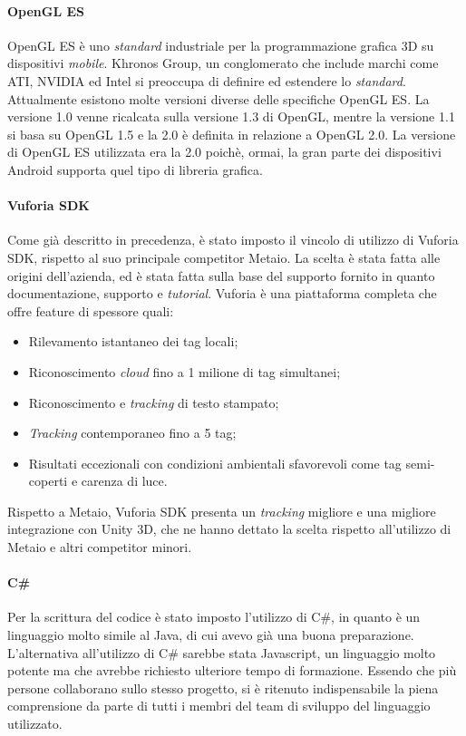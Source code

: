 \paragraph{OpenGL ES}
OpenGL ES è uno \textit{standard} industriale per la programmazione grafica 3D su dispositivi \textit{mobile}. Khronos Group, un conglomerato che include marchi come ATI, NVIDIA ed Intel si preoccupa di definire ed estendere lo \textit{standard}.
Attualmente esistono molte versioni diverse delle specifiche OpenGL ES. La versione 1.0 venne ricalcata sulla versione 1.3 di OpenGL, mentre la versione 1.1 si basa su OpenGL 1.5 e la 2.0 è definita in relazione a OpenGL 2.0. La versione di OpenGL ES utilizzata era la 2.0 poich\`e, ormai, la gran parte dei dispositivi Android supporta quel tipo di libreria grafica.

\paragraph{Vuforia SDK}
Come gi\`a descritto in precedenza, \`e stato imposto il vincolo di utilizzo di Vuforia SDK, rispetto al suo principale competitor Metaio. La scelta \`e stata fatta alle origini dell'azienda, ed \`e stata fatta sulla base del supporto fornito in quanto documentazione, supporto e \textit{tutorial}. Vuforia \`e una piattaforma completa che offre feature di spessore quali:

\begin{itemize}
	\item Rilevamento istantaneo dei tag locali;
	\item Riconoscimento \textit{cloud} fino a 1 milione di tag simultanei;
	\item Riconoscimento e \textit{tracking} di testo stampato;
	\item \textit{Tracking} contemporaneo fino a 5 tag;
	\item Risultati eccezionali con condizioni ambientali sfavorevoli come tag semi-coperti e carenza di luce.
\end{itemize}

Rispetto a Metaio, Vuforia SDK presenta un \textit{tracking} migliore e una migliore integrazione con Unity 3D, che ne hanno dettato la scelta rispetto all'utilizzo di Metaio e altri competitor minori. 


\paragraph{C\#}
Per la scrittura del codice \`e stato imposto l'utilizzo di C\#, in quanto \`e un linguaggio molto simile al Java, di cui avevo gi\`a una buona preparazione. L'alternativa all'utilizzo di C\# sarebbe stata Javascript, un linguaggio molto potente ma che avrebbe richiesto ulteriore tempo di formazione. Essendo che pi\`u persone collaborano sullo stesso progetto, si \`e ritenuto indispensabile la piena comprensione da parte di tutti i membri del team di sviluppo del linguaggio utilizzato.

